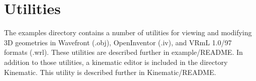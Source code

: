 \documentclass[11pt, letterpaper]{article}
\begin{document}
\section{Utilities}
The examples directory contains a number of utilities for viewing and modifying 3D geometries in Wavefront (.obj), OpenInventor (.iv), and VRmL 1.0/97 formats (.wrl). These utilities are described further in example/README. In addition to those utilities, a kinematic editor is included in the directory Kinematic. This utility is described further in Kinematic/README.
\end{document}
